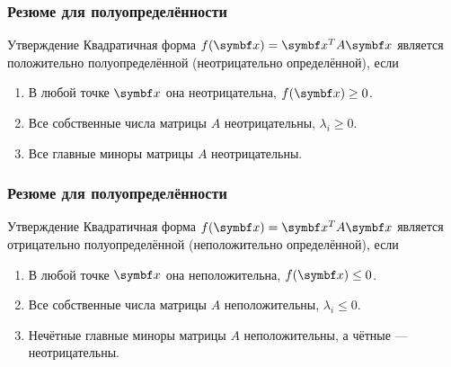 \begin{frame}
    \frametitle{Резюме для полуопределённости}

    \begin{block}{Утверждение}
        Квадратичная форма $f(\bx) = \bx^T A\bx$ является положительно полуопределённой (неотрицательно определённой), если \pause

        \begin{enumerate}
            \item В любой точке $\bx$ она неотрицательна, $f(\bx) \geq 0$. \pause
            \item Все собственные числа матрицы $A$ неотрицательны, $\lambda_i \geq 0$. \pause
            \item Все главные миноры матрицы $A$ неотрицательны.
        \end{enumerate}
            
    \end{block}


\end{frame}



\begin{frame}
    \frametitle{Резюме для полуопределённости}

    \begin{block}{Утверждение}
        Квадратичная форма $f(\bx) = \bx^T A\bx$ является отрицательно полуопределённой (неположительно определённой), если \pause

        \begin{enumerate}
            \item В любой точке $\bx$ она неположительна, $f(\bx) \leq 0$. \pause
            \item Все собственные числа матрицы $A$ неположительны, $\lambda_i \leq 0$. \pause
            \item Нечётные главные миноры матрицы $A$ неположительны, а чётные — неотрицательны.
        \end{enumerate}
            
    \end{block}


\end{frame}
